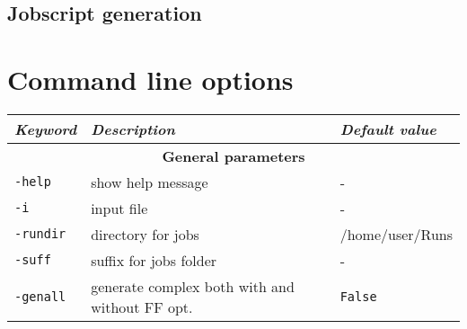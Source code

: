 \documentclass[a4paper,12pt]{assignment}
\begin{document}
\subsection{Jobscript generation}


\section{Command line options}


\centering
\small
\begin{tabular}{|l|l|l|}
\hline
\textit{\textbf{Keyword}} & \textit{\textbf{Description}} & \textit{\textbf{Default value}} \\
\hline
\multicolumn{3}{|c|}{\Large \textbf{General parameters}}\\ \hline
\texttt{-help} & show help message & - \\
\texttt{-i} & input file & - \\
\texttt{-rundir} & directory for jobs & /home/user/Runs \\
\texttt{-suff} & suffix for jobs folder & - \\
\texttt{-genall} & generate complex both with and without FF opt. & \texttt{False} \\
\hline
\end{tabular}
\end{document}
